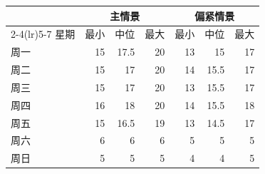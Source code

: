 \begin{tabular}{lrrrrrr}
\toprule
 & \multicolumn{3}{c}{主情景} & \multicolumn{3}{c}{偏紧情景} \\
\cmidrule(lr){2-4}\cmidrule(lr){5-7}
星期 & 最小 & 中位 & 最大 & 最小 & 中位 & 最大 \\
\midrule
周一 & 15 & 17.5 & 20 & 13 & 15 & 17 \\
周二 & 15 & 17 & 20 & 14 & 15.5 & 17 \\
周三 & 15 & 17 & 20 & 13 & 15.5 & 17 \\
周四 & 16 & 18 & 20 & 14 & 15.5 & 18 \\
周五 & 15 & 16.5 & 19 & 13 & 14.5 & 17 \\
周六 & 6 & 6 & 6 & 5 & 5 & 5 \\
周日 & 5 & 5 & 5 & 4 & 4 & 5 \\
\bottomrule
\end{tabular}
